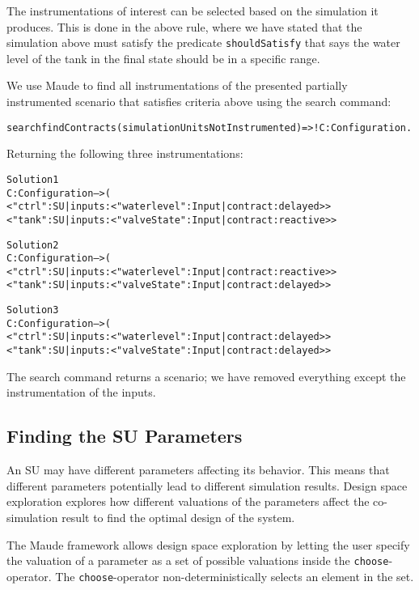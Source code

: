 The instrumentations of interest can be selected based on the simulation it produces. 
This is done in the above rule, where we have stated that the simulation above must satisfy the predicate \texttt{shouldSatisfy} that says the water level of the tank in the final state should be in a specific range.

\begin{example}
We use Maude to find all instrumentations of the presented partially instrumented scenario that satisfies criteria above using the search command: 
\small
\begin{alltt}
search findContracts(simulationUnitsNotInstrumented) =>! C:Configuration .
\end{alltt}
Returning the following three instrumentations:
\begin{alltt}
Solution 1
C:Configuration --> (
< "ctrl" : SU | inputs : < "waterlevel" : Input | contract : delayed > >
< "tank" : SU | inputs : < "valveState" : Input | contract : reactive > >

Solution 2
C:Configuration --> (
< "ctrl" : SU | inputs : < "waterlevel" : Input | contract : reactive > >
< "tank" : SU | inputs : < "valveState" : Input | contract : delayed > >

Solution 3
C:Configuration --> (
< "ctrl" : SU | inputs : < "waterlevel" : Input | contract : delayed > >
< "tank" : SU | inputs : < "valveState" : Input | contract : delayed > >

\end{alltt}
\normalsize
The search command returns a scenario; we have removed everything except the instrumentation of the inputs.
\end{example}

\subsection{Finding the SU Parameters}
An SU may have different parameters affecting its behavior.
This means that different parameters potentially lead to different simulation results.
Design space exploration explores how different valuations of the parameters affect the co-simulation result to find the optimal design of the system. 

The Maude framework allows design space exploration by letting the user specify the valuation of a parameter as a set of possible valuations inside the \texttt{choose}-operator.
The \texttt{choose}-operator non-deterministically selects an element in the set.

